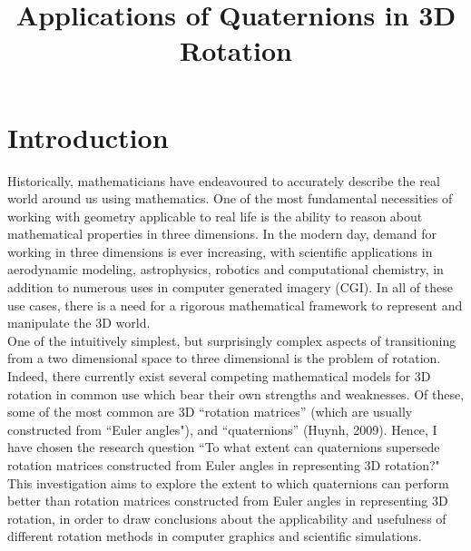 \documentclass[12pt, a4paper]{article}
\title{\vspace{-2cm}Applications of Quaternions in 3D Rotation}
\date{}
\begin{document}
\maketitle
\tableofcontents

\pagebreak

\section*{Introduction}
Historically, mathematicians have endeavoured to accurately describe the real
world around us using mathematics. One of the most fundamental necessities of
working with geometry applicable to real life is the ability to reason about
mathematical properties in three dimensions. In the modern day, demand for
working in three dimensions is ever increasing, with scientific applications in
aerodynamic modeling, astrophysics, robotics and computational chemistry, in
addition to numerous uses in computer generated imagery (CGI). In all of these
use cases, there is a need for a rigorous mathematical framework to represent
and manipulate the 3D world. \\

One of the intuitively simplest, but surprisingly complex aspects of
transitioning from a two dimensional space to three dimensional is the problem
of rotation. Indeed, there currently exist several competing mathematical models
for 3D rotation in common use which bear their own strengths and weaknesses. Of
these, some of the most common are 3D ``rotation matrices'' (which are usually
constructed from ``Euler angles"), and ``quaternions'' (Huynh, 2009). Hence, I
have chosen the research question ``To what extent can quaternions supersede
rotation matrices constructed from Euler angles in representing 3D rotation?"\\

This investigation aims to explore the extent to which quaternions can perform
better than rotation matrices constructed from Euler angles in representing 3D
rotation, in order to draw conclusions about the applicability and usefulness of
different rotation methods in computer graphics and scientific simulations. \\
\end{document}
